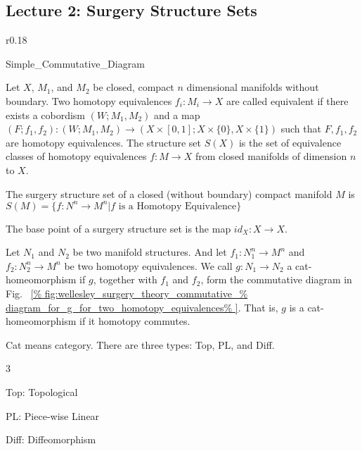 \documentclass[crop=false,class=book,oneside]{standalone}
\begin{document}
    \subsection{Lecture 2: Surgery Structure Sets}
        \begin{wrapfigure}[8]{r}{0.18\textwidth}
            \centering
            \captionsetup{type=figure}
            \vspace{-4ex}
            
                      {Simple_Commutative_Diagram}
            \caption{Example of a Commutative Diagram.}
            \label{fig:wellesley_surgery_theory_commutative_%
                   diagram_for_g_for_two_homotopy_equivalences}
        \end{wrapfigure}
        Let $X$, $M_{1}$, and $M_{2}$ be closed,
        compact $n$ dimensional manifolds without boundary.
        Two homotopy equivalences $f_{i}:M_{i}\rightarrow X$
        are called equivalent if there exists a cobordism
        $(W;M_{1},M_{2})$ and a map
        $(F;f_{1},f_{2}):(W;M_{1},M_{2})%
         \rightarrow(X\times[0,1];X\times\{0\},X\times\{1\})$
        such that $F,f_{1},f_{2}$ are homotopy equivalences.
        The structure set $S(X)$ is the set of equivalence
        classes of homotopy equivalences $f:M\rightarrow X$
        from closed manifolds of dimension $n$ to $X$.
        \hfill
        \begin{definition}
            The surgery structure set of a closed
            (without boundary) compact manifold $M$ is
            $S(M)=\{f:N^{n}\rightarrow{M^{n}}|f%
             \textrm{ is a Homotopy Equivalence}\}$
        \end{definition}
        \begin{definition}
            The base point of a surgery structure
            set is the map $id_{X}:X\rightarrow X$.
        \end{definition}
        Let $N_{1}$ and $N_{2}$ be two manifold structures.
        And let $f_{1}:N_{1}^{n}\rightarrow M^{n}$ and
        $f_{2}:N_{2}^{n}\rightarrow M^{n}$ be two homotopy
        equivalences. We call $g:N_{1}\rightarrow N_{2}$ a
        cat-homeomorphism if $g$, together with $f_{1}$ and
        $f_{2}$, form the commutative diagram in Fig.~%
        \ref{%
            fig:wellesley_surgery_theory_commutative_%
            diagram_for_g_for_two_homotopy_equivalences%
        }.
        That is, $g$ is a cat-homeomorphism if it
        homotopy commutes.
        \begin{remark}
            Cat means category. There are three types:
            Top, PL, and Diff. 
            \begin{itemize}
                \begin{multicols}{3}
                    \item Top: Topological
                    \item PL: Piece-wise Linear
                    \item Diff: Diffeomorphism
                \end{multicols}
            \end{itemize}
        \end{remark}
\end{document}
